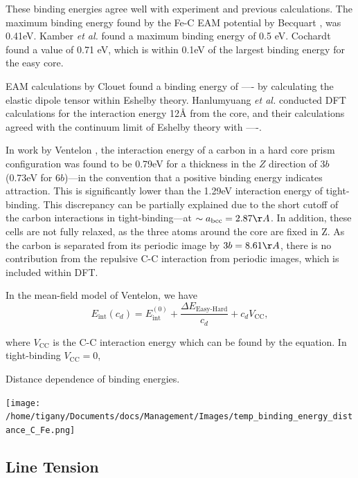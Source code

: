 \documentclass[a4paper]{article}
\begin{document}
{These binding energies agree well with experiment and previous
calculations. The maximum binding energy found by the Fe-C EAM
potential by Becquart \cite{Becquart2007}, was 0.41eV. Kamber
\emph{et al.} found a maximum binding energy of 0.5 eV. Cochardt
found a value of 0.71 eV, which is within 0.1eV of the largest
binding energy for the easy core. 

EAM calculations by Clouet \cite{Clouet2008} found a binding energy of ---- by calculating the
elastic dipole tensor within Eshelby theory. 
Hanlumyuang \emph{et al.} \cite{Hanlumyuang2010} conducted DFT calculations for the interaction energy 12\AA{} from the core,
and their calculations agreed with the continuum limit of Eshelby theory with ----. 


In work by Ventelon \cite{Ventelon2015}, the interaction energy of a carbon in a hard
core prism configuration was found to be 0.79eV for a thickness in the \(Z\) direction of 3\(b\) (0.73eV for \(6b\))---in the
convention that a positive binding energy indicates attraction. This is significantly lower than
the 1.29eV interaction energy of tight-binding. This discrepancy can be
partially explained due to the short cutoff of the carbon interactions in tight-binding---at
\(\sim a_{\text{bcc}} = 2.87 \AA\). In addition, these cells are not fully relaxed, as the three
atoms around the core are fixed in Z. As the carbon is separated from its periodic image by \(3b =
    8.61\AA\), there is no contribution from the repulsive C-C interaction from periodic images,
which is included within DFT.


In the mean-field model of Ventelon, we have
\[ E_{\text{int}}( c_d ) = E^{(0)}_{\text{int}} + \frac{\Delta E_{\text{Easy-Hard}}}{c_d} + c_d V_{\text{CC}} , \]

where \(V_{\text{CC}}\) is the C-C interaction energy which can be found by the equation. In
tight-binding \(V_{\text{CC}}= 0\), 



Distance dependence of binding energies. 

\begin{center}
\texttt{[image: /home/tigany/Documents/docs/Management/Images/temp\_binding\_energy\_distance\_C\_Fe.png]}
\end{center}



\subsection{Line Tension}
\label{sec:org3a86064}


}
\end{document}
